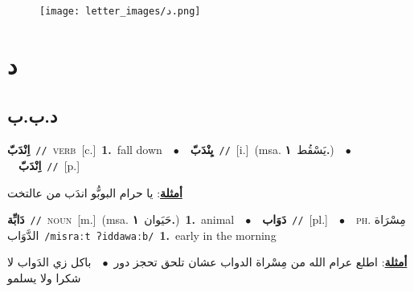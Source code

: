 \documentclass[10pt,a4paper,twoside]{article} %
\begin{document}
\begin{figure*}[t!]\centering\texttt{[image: letter\_images/د.png]}\end{figure*}
\color{white}

 \section*{\foreignlanguage{arabic}{د}} 
 \begin{multicols}{2} 

%
\color{black}
\vspace{-3mm}
\subsection*{\color{blue}\foreignlanguage{arabic}{د.ب.ب}\color{blue}{}} 

{\setlength\topsep{0pt}\textbf{\foreignlanguage{arabic}{اِنْدَبّ}}\ {\color{gray}\texttt{//}\color{black}}\ \textsc{verb}\ [c.]\ \textbf{1.}~fall down\ \ $\bullet$\ \ \setlength\topsep{0pt}\textbf{\foreignlanguage{arabic}{يِنْدَبّ}}\ {\color{gray}\texttt{//}\color{black}}\ [i.]\ \color{gray}(msa. \foreignlanguage{arabic}{يَسْقُط}~\foreignlanguage{arabic}{\textbf{١.}})\color{black}\ \ $\bullet$\ \ \setlength\topsep{0pt}\textbf{\foreignlanguage{arabic}{اِنْدَبّ}}\ {\color{gray}\texttt{//}\color{black}}\ [p.]\  \begin{flushright}\color{gray}\foreignlanguage{arabic}{\textbf{\underline{\foreignlanguage{arabic}{أمثلة}}}: يا حرام البوبُّو اندَب من عالتخت}\end{flushright}\color{black}} \vspace{2mm}

{\setlength\topsep{0pt}\textbf{\foreignlanguage{arabic}{دَابِّة}}\ {\color{gray}\texttt{//}\color{black}}\ \textsc{noun}\ [m.]\ \color{gray}(msa. \foreignlanguage{arabic}{حَيَوان}~\foreignlanguage{arabic}{\textbf{١.}})\color{black}\ \textbf{1.}~animal\ \ $\bullet$\ \ \setlength\topsep{0pt}\textbf{\foreignlanguage{arabic}{دَوَاب}}\ {\color{gray}\texttt{//}\color{black}}\ [pl.]\ \ $\bullet$\ \ \textsc{ph.} \color{gray} \foreignlanguage{arabic}{مِسْرَاة الدَّوَاب}\color{black}\ {\color{gray}\texttt{/{\sffamily misraːt ʔiddawaːb}/}\color{black}}\ \textbf{1.}~early in the morning\  \begin{flushright}\color{gray}\foreignlanguage{arabic}{\textbf{\underline{\foreignlanguage{arabic}{أمثلة}}}: اطلع عرام الله من مِسْراة الدواب عشان تلحق تحجز دور\ $\bullet$\ \  باكل زي الدَواب لا شكرا ولا يسلمو}\end{flushright}\color{black}} \vspace{2mm}


\end{multicols}
\end{document}

